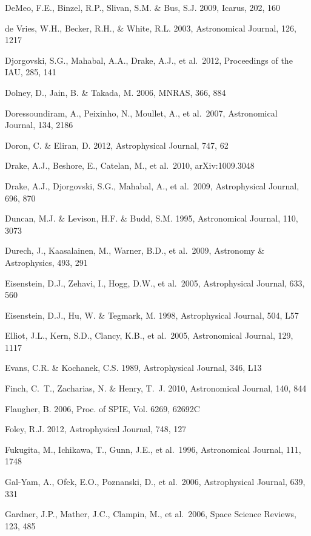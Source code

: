 \documentclass{emulateapj}
\begin{document}
\begin{thebibliography}{}
\bibitem[()]{} DeMeo, F.E., Binzel, R.P., Slivan, S.M. \& Bus, S.J. 2009, Icarus, 202, 160

\bibitem[()]{} de Vries, W.H., Becker, R.H., \& White, R.L. 2003, Astronomical Journal, 126, 1217

\bibitem[()]{} Djorgovski, S.G., Mahabal, A.A., Drake, A.J., et al.~2012, Proceedings of the IAU, 285, 141

\bibitem[()]{} Dolney, D., Jain, B. \& Takada, M. 2006, MNRAS, 366, 884

\bibitem[()]{} Doressoundiram, A., Peixinho, N., Moullet, A., et al.~2007, Astronomical Journal, 134, 2186

\bibitem[()]{} Doron, C. \& Eliran, D. 2012, Astrophysical Journal, 747, 62

\bibitem[()]{} Drake, A.J., Beshore, E., Catelan, M., et al.~2010, arXiv:1009.3048 

\bibitem[()]{} Drake, A.J., Djorgovski, S.G., Mahabal, A., et al.~2009, Astrophysical Journal, 696, 870

\bibitem[()]{} Duncan, M.J. \& Levison, H.F. \& Budd, S.M. 1995, Astronomical Journal, 110, 3073

\bibitem[()]{} Durech, J., Kaasalainen, M., Warner, B.D., et al.~2009, Astronomy \& Astrophysics, 493, 291

\bibitem[()]{} Eisenstein, D.J., Zehavi, I., Hogg, D.W., et al.~2005, Astrophysical Journal, 633, 560

\bibitem[()]{} Eisenstein, D.J., Hu, W. \& Tegmark, M. 1998, Astrophysical Journal, 504, L57

\bibitem[()]{} Elliot, J.L., Kern, S.D., Clancy, K.B., et al.~2005,  Astronomical Journal, 129, 1117

\bibitem[()]{} Evans, C.R. \& Kochanek, C.S. 1989, Astrophysical Journal, 346, L13

\bibitem[()]{} Finch, C.~T., Zacharias, N. \& Henry, T.~J. 2010, Astronomical Journal, 140, 844

\bibitem[()]{} Flaugher, B. 2006, Proc. of SPIE, Vol. 6269, 62692C

\bibitem[()]{} Foley, R.J. 2012, Astrophysical Journal, 748, 127

\bibitem[()]{} Fukugita, M., Ichikawa, T., Gunn, J.E., et al.~1996, Astronomical Journal, 111, 1748

\bibitem[()]{} Gal-Yam, A., Ofek, E.O., Poznanski, D., et al.~2006, Astrophysical Journal, 639, 331

\bibitem[()]{} Gardner, J.P., Mather, J.C., Clampin, M., et al.~2006, Space Science Reviews, 123, 485


\end{thebibliography}
\end{document}
